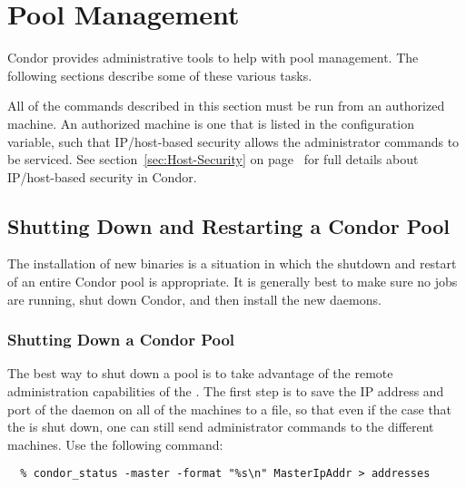 \section{\label{sec:Pool-Management}Pool Management}

Condor provides administrative tools to help with
pool management.
The following sections describe some of these various tasks.

All of the commands described in this section must be run from an
authorized machine. 
An authorized machine is one that is listed in the 
 configuration variable,
such that IP/host-based security allows the
administrator commands to be serviced.
See section~\ref{sec:Host-Security} on
page~\pageref{sec:Host-Security} for full details about IP/host-based
security in Condor.

\subsection{\label{sec:Pool-Shutdown-and-Restart}
Shutting Down and Restarting a Condor Pool}

The installation of new binaries is a situation in which the
shutdown and restart of an entire Condor pool is appropriate.
It is generally
best to make sure no jobs are running, shut down Condor, and then
install the new daemons.

\subsubsection{\label{sec:Pool-Shutdown}Shutting Down a Condor Pool}

The best way to shut down a pool is to take advantage of the remote
administration capabilities of the .
The first step is to save the IP address and port of the
 daemon on all of the machines to a file, so that 
even if the case that the  is shut down, one can still send
administrator commands to the different machines.
Use the following command:
\footnotesize
\begin{verbatim}
  % condor_status -master -format "%s\n" MasterIpAddr > addresses
\end{verbatim}
\normalsize

